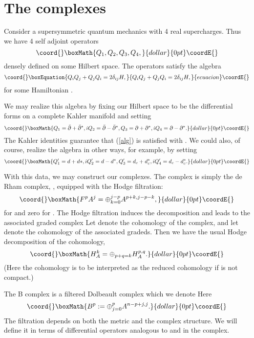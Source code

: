 \documentclass[a4paper,11pt]{amsart}
\providecommand{\db}{\bar{\partial}}
\providecommand{\p}{\partial}
\begin{document}
 
\section{The complexes}\label{ABC} 
Consider a supersymmetric quantum mechanics with 4 real supercharges. Thus we 
have 4 self adjoint operators 
$$\coord{}\boxMath{Q_1,Q_2,Q_3,Q_4,}{dollar}{0pt}\coordE{}$$ 
densely defined on some Hilbert space. The operators satisfy the algebra 
\begin{equation}\coord{}\boxEquation{\label{alg}
Q_iQ_j+Q_jQ_i = 2\delta_{ij}H,
}{Q_iQ_j+Q_jQ_i = 2\delta_{ij}H,
}{ecuacion}\coordE{}\end{equation}
for some Hamiltonian \coordHE{}. 

We may realize this algebra by fixing our Hilbert space to be the \coordHE{}
differential forms on a complete Kahler manifold \coordHE{} and setting  
$$\coord{}\boxMath{Q_1 = \db + \db^*, iQ_2 = \db - \db^*, Q_3 = \p + \p^*, iQ_4 = \p - \p^*.}{dollar}{0pt}\coordE{}$$
The Kahler identities guarantee that (\ref{alg}) is satisfied with 
\coordHE{}. We could also, of course,  realize the algebra in other ways, for
example, by setting 
$$\coord{}\boxMath{Q_1'= d+d*, iQ_2' = d - d^*, Q_3' = d_c+d_c^*, iQ_4' = d_c-d_c^*.}{dollar}{0pt}\coordE{}$$

With this data, we may construct our complexes. 
   The \coordHE{} complex is simply the de Rham complex, 
\coordHE{}, equipped with the Hodge filtration:  
$$\coord{}\boxMath{F^pA^j = \oplus_{k=0}^{j-p}A^{p+k,j-p-k},}{dollar}{0pt}\coordE{}$$
for \coordHE{} and zero for \coordHE{}.
 The Hodge filtration induces 
the decomposition \myHighlight{$d = \db + \p$}\coordHE{} and leads to the associated graded complex 
\myHighlight{$(\oplus_p A^{p,\cdot},\db).$}\coordHE{} Let \coordHE{} denote the cohomology of the 
\coordHE{} complex, and let \coordHE{} denote the cohomology of the 
associated gradeds.  Then we have the usual Hodge decomposition of the
cohomology, 
$$\coord{}\boxMath{H^k_A = \oplus_{p+q=k}H^{p,q}_A.}{dollar}{0pt}\coordE{}$$
(Here the cohomology is to be interpreted as the reduced \coordHE{} cohomology
 if \coordHE{} is not compact.)
 
 
 The B complex is a filtered Dolbeault complex which we denote 
\myHighlight{$(B^{\cdot},\db,K^{\cdot}).$}\coordHE{} Here 
$$\coord{}\boxMath{B^p := \oplus_{j=0}^pA^{n-p+j,j}.}{dollar}{0pt}\coordE{}$$
The filtration \coordHE{} depends on 
both the metric and the complex structure. We will define it in terms of 
differential operators analogous to \myHighlight{$\db $}\coordHE{} and \myHighlight{$\partial$}\coordHE{} in the \coordHE{} complex.
\end{document}
